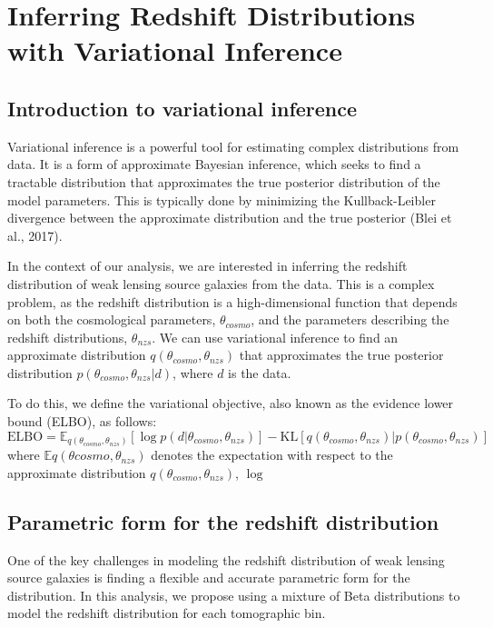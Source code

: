 \documentclass[twocolumn,draft]{aastex631}
\begin{document}
\section{Inferring Redshift Distributions with Variational Inference}


\subsection{Introduction to variational inference}

Variational inference is a powerful tool for estimating complex distributions from data. It is a form of approximate Bayesian inference, which seeks to find a tractable distribution that approximates the true posterior distribution of the model parameters. This is typically done by minimizing the Kullback-Leibler divergence between the approximate distribution and the true posterior (Blei et al., 2017).

In the context of our analysis, we are interested in inferring the redshift distribution of weak lensing source galaxies from the data. This is a complex problem, as the redshift distribution is a high-dimensional function that depends on both the cosmological parameters, $\theta_{cosmo}$, and the parameters describing the redshift distributions, $\theta_{nzs}$. We can use variational inference to find an approximate distribution $q(\theta_{cosmo},\theta_{nzs})$ that approximates the true posterior distribution $p(\theta_{cosmo},\theta_{nzs}|d)$, where $d$ is the data.

To do this, we define the variational objective, also known as the evidence lower bound (ELBO), as follows:
\begin{equation}
\text{ELBO} = \mathbb{E}_{q(\theta_{cosmo},\theta_{nzs})} \left[ \log p(d|\theta_{cosmo},\theta_{nzs}) \right] - \text{KL}\left[ q(\theta_{cosmo},\theta_{nzs}) | p(\theta_{cosmo},\theta_{nzs})\right]
\end{equation}
where $\mathbb{E}{q(\theta{cosmo},\theta_{nzs})}$ denotes the expectation with respect to the approximate distribution $q(\theta_{cosmo},\theta_{nzs})$, $\log $

\subsection{Parametric form for the redshift distribution}

One of the key challenges in modeling the redshift distribution of weak lensing source galaxies is finding a flexible and accurate parametric form for the distribution. In this analysis, we propose using a mixture of Beta distributions to model the redshift distribution for each tomographic bin.
\end{document}
